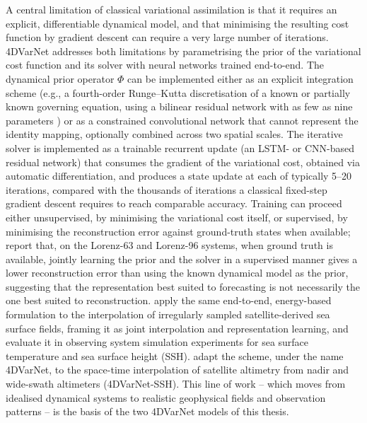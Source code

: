 \documentclass[english, 12pt, a4paper, elec, utf8, a-2b, online]{aaltothesis}
\begin{document}
A central limitation of classical variational assimilation
\cite{ledimet1986} is that
it requires an explicit, differentiable dynamical model, and that
minimising the resulting cost function by gradient descent can
require a very large number of iterations. 4DVarNet
\cite{fablet2020fourdvarnet} addresses both limitations by
parametrising the prior of the variational cost function and its
solver with neural networks trained end-to-end. The dynamical prior
operator $\Phi$ can be implemented either as an explicit
integration scheme (e.g., a fourth-order Runge--Kutta discretisation
of a known or partially known governing equation, using a bilinear
residual network with as few as nine parameters
\cite{fablet2018bilinear}) or as a constrained convolutional network
that cannot represent the identity mapping, optionally
combined across two spatial scales. The iterative solver is
implemented as a trainable recurrent update (an LSTM- or
CNN-based residual network) that consumes the gradient of the
variational cost, obtained via automatic differentiation, and
produces a state update at each of typically 5--20 iterations,
compared with the thousands of iterations a classical fixed-step
gradient descent requires to reach comparable accuracy. Training can
proceed either unsupervised, by minimising the variational cost
itself, or supervised, by minimising the reconstruction error
against ground-truth states when available; \citeauthor{fablet2020fourdvarnet}
report that, on the Lorenz-63 and Lorenz-96 systems, when ground truth is
available, jointly learning the prior and the solver in a supervised manner
gives a lower reconstruction error than using the known dynamical model as
the prior, suggesting that the representation best suited to forecasting is not
necessarily the one best suited to reconstruction. \citeauthor{fablet2021james}
\cite{fablet2021james} apply the same end-to-end, energy-based formulation to
the interpolation of irregularly sampled satellite-derived sea surface fields,
framing it as joint interpolation and representation learning, and evaluate it
in observing system simulation experiments for sea surface temperature and sea
surface height (SSH). \citeauthor{beauchamp2023ssh} \cite{beauchamp2023ssh} adapt
the scheme, under the name 4DVarNet, to the space-time interpolation of
satellite altimetry from nadir and wide-swath altimeters (4DVarNet-SSH). This
line of work -- which moves from idealised dynamical systems to realistic
geophysical fields and observation patterns -- is the basis of the two
4DVarNet models of this thesis.
\end{document}
